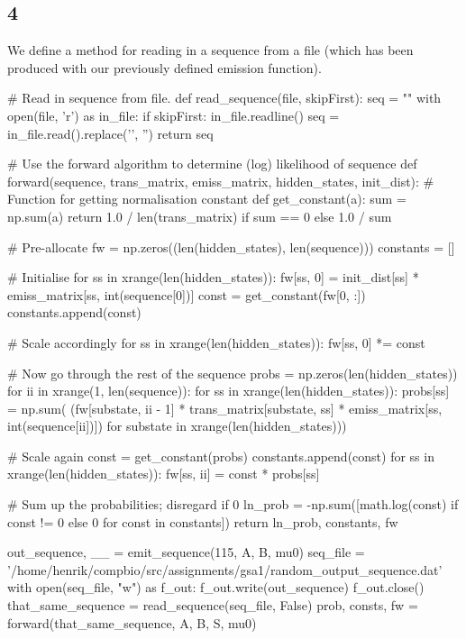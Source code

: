\documentclass[10pt]{article}\usepackage[]{graphicx}\usepackage[]{color}
\theoremstyle{plain}
\begin{document}
\subsection*{4}
We define a method for reading in a sequence from a file (which has been produced with our previously defined emission function). 
\begin{Schunk}
\begin{Sinput}
# Read in sequence from file.
def read_sequence(file, skipFirst):
    seq = ""
    with open(file, 'r') as in_file:
        if skipFirst:
            in_file.readline()
        seq = in_file.read().replace('\n', '')
    return seq


# Use the forward algorithm to determine (log) likelihood of sequence
def forward(sequence, trans_matrix, emiss_matrix, hidden_states, init_dist):
    # Function for getting normalisation constant
    def get_constant(a):
        sum = np.sum(a)
        return 1.0 / len(trans_matrix) if sum == 0 else 1.0 / sum

    # Pre-allocate
    fw = np.zeros((len(hidden_states), len(sequence)))
    constants = []

    # Initialise
    for ss in xrange(len(hidden_states)):
        fw[ss, 0] = init_dist[ss] * emiss_matrix[ss, int(sequence[0])]
    const = get_constant(fw[0, :])
    constants.append(const)

    # Scale accordingly
    for ss in xrange(len(hidden_states)):
        fw[ss, 0] *= const

    # Now go through the rest of the sequence
    probs = np.zeros(len(hidden_states))
    for ii in xrange(1, len(sequence)):
        for ss in xrange(len(hidden_states)):
            probs[ss] = np.sum(
                (fw[substate, ii - 1] * trans_matrix[substate, ss] * emiss_matrix[ss, int(sequence[ii])]) for
                substate in xrange(len(hidden_states)))

        # Scale again
        const = get_constant(probs)
        constants.append(const)
        for ss in xrange(len(hidden_states)):
            fw[ss, ii] = const * probs[ss]

    # Sum up the probabilities; disregard if 0
    ln_prob = -np.sum([math.log(const) if const != 0 else 0 for const in constants])
    return ln_prob, constants, fw

out_sequence, __ = emit_sequence(115, A, B, mu0)
seq_file = '/home/henrik/compbio/src/assignments/gsa1/random_output_sequence.dat'
with open(seq_file, "w") as f_out:
    f_out.write(out_sequence)
    f_out.close()
that_same_sequence = read_sequence(seq_file, False)
prob, consts, fw = forward(that_same_sequence, A, B, S, mu0)
\end{Sinput}
\end{Schunk}
\end{document}
